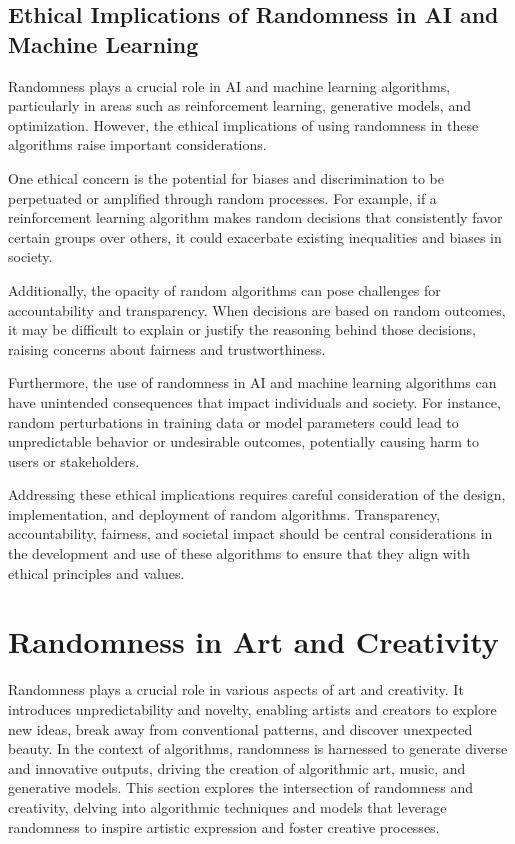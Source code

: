 \documentclass[12pt]{book} %
\begin{document}
\subsection{Ethical Implications of Randomness in AI and Machine Learning}

Randomness plays a crucial role in AI and machine learning algorithms, particularly in areas such as reinforcement learning, generative models, and optimization. However, the ethical implications of using randomness in these algorithms raise important considerations.

One ethical concern is the potential for biases and discrimination to be perpetuated or amplified through random processes. For example, if a reinforcement learning algorithm makes random decisions that consistently favor certain groups over others, it could exacerbate existing inequalities and biases in society.

Additionally, the opacity of random algorithms can pose challenges for accountability and transparency. When decisions are based on random outcomes, it may be difficult to explain or justify the reasoning behind those decisions, raising concerns about fairness and trustworthiness.

Furthermore, the use of randomness in AI and machine learning algorithms can have unintended consequences that impact individuals and society. For instance, random perturbations in training data or model parameters could lead to unpredictable behavior or undesirable outcomes, potentially causing harm to users or stakeholders.

Addressing these ethical implications requires careful consideration of the design, implementation, and deployment of random algorithms. Transparency, accountability, fairness, and societal impact should be central considerations in the development and use of these algorithms to ensure that they align with ethical principles and values.

\section{Randomness in Art and Creativity}

Randomness plays a crucial role in various aspects of art and creativity. It introduces unpredictability and novelty, enabling artists and creators to explore new ideas, break away from conventional patterns, and discover unexpected beauty. In the context of algorithms, randomness is harnessed to generate diverse and innovative outputs, driving the creation of algorithmic art, music, and generative models. This section explores the intersection of randomness and creativity, delving into algorithmic techniques and models that leverage randomness to inspire artistic expression and foster creative processes.
\end{document}
